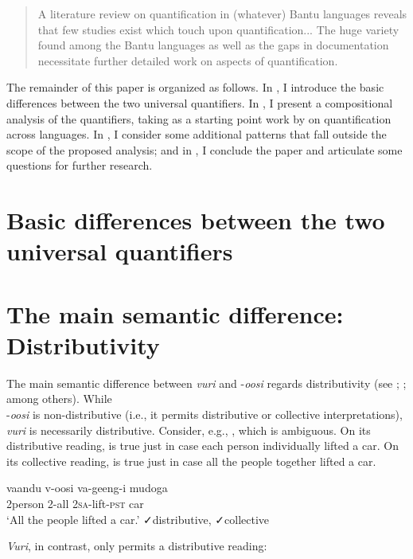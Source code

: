 \documentclass[output=paper]{langsci/langscibook}
\begin{document}
\begin{quote}
A literature review on quantification in (whatever) Bantu languages reveals that few studies exist which touch upon quantification... The huge variety found among the Bantu languages as well as the gaps in documentation necessitate further detailed work on aspects of quantification. \citep[383, 412]{ZerbianKrifka2008}
\end{quote}

The remainder of this paper is organized as follows. In , I introduce the basic differences between the two universal quantifiers. In , I present a compositional analysis of the quantifiers, taking as a starting point work by \citet{Matthewson2013} on quantification across languages. In , I consider some additional patterns that fall outside the scope of the proposed analysis; and in , I conclude the paper and articulate some questions for further research.

\section{Basic differences between the two universal quantifiers}

\section{The main semantic difference: Distributivity} 

The main semantic difference between \textit{vuri} and -\textit{oosi} regards distributivity (see \citealt{Gil1995}; \citealt{Vendler1962}; among others). While \\
-\textit{oosi} is non-distributive (i.e., it permits distributive or collective interpretations), \textit{vuri} is necessarily distributive. Consider, e.g., , which is ambiguous. On its distributive reading,  is true just in case each person individually lifted a car. On its collective reading,  is true just in case all the people together lifted a car.

\ea
\gll vaandu  v-oosi    va-geeng-i    mudoga\\
     2person  2-all    2\textsc{sa}-lift-\textsc{pst}    car\\
\glt ‘All the people lifted a car.’  ✓distributive, ✓collective
\z

\textit{Vuri}, in contrast, only permits a distributive reading:
\end{document}
